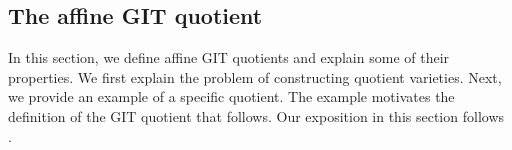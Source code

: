 \documentclass[12pt]{amsart}
\theoremstyle{plain}
\theoremstyle{definition}
\begin{document}





\subsection{The affine GIT quotient}\label{section:gitquotient}
In this section, we define affine GIT quotients and explain some of their properties.
We first explain the problem of constructing quotient varieties.
Next, we provide an example of a specific quotient.
The example motivates the definition of the GIT quotient that follows.
Our exposition in this section follows \cite[\S 5.1]{Mukai03}.
\end{document}
